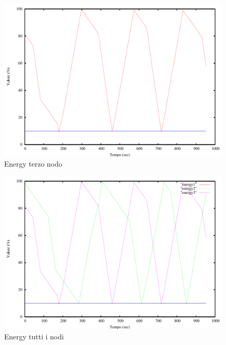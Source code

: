 \begin{figure}[H]
\begin{center}
\includegraphics[scale=0.6]{etc/energy3.pdf}
\caption{Energy terzo nodo}
\label{fig:energy3}
\end{center}
\end{figure}
\begin{figure}[H]
\begin{center}
\includegraphics[scale=0.6]{etc/energy.pdf}
\caption{Energy tutti i nodi}
\label{fig:energy}
\end{center}
\end{figure}